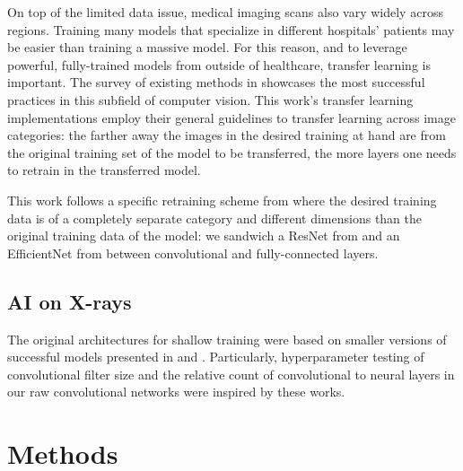 \documentclass[10pt,twocolumn,letterpaper]{article}
\begin{document}
On top of the limited data issue, medical imaging scans also vary widely across regions. Training many models that specialize in different hospitals' patients may be easier than training a massive model. For this reason, and to leverage powerful, fully-trained models from outside of healthcare, transfer learning is important. The survey of existing methods in \cite{surveytransfer} showcases the most successful practices in this subfield of computer vision. This work's transfer learning implementations employ their general guidelines to transfer learning across image categories: the farther away the images in the desired training at hand are from the original training set of the model to be transferred, the more layers one needs to retrain in the transferred model. 

This work follows a specific retraining scheme from \cite{surveytransfer} where the desired training data is of a completely separate category and different dimensions than the original training data of the model: we sandwich a ResNet from \cite{resnet} and an EfficientNet from \cite{efficientnet} between convolutional and fully-connected layers.

\subsection{AI on X-rays}

The original architectures for shallow training were based on smaller versions of successful models presented in \cite{aixray} and \cite{aidiag}. Particularly, hyperparameter testing of convolutional filter size and the relative count of convolutional to neural layers in our raw convolutional networks were inspired by these works.

\section{Methods}
\end{document}
